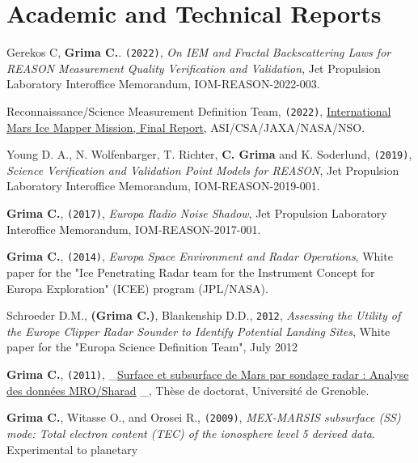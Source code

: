 \section*{Academic and Technical Reports}

\begin{etaremune}
\def\labelenumi{\arabic{enumi}.}
\item
   Gerekos C, \textbf{Grima C.}. \texttt{(2022)}, \emph{On IEM and Fractal Backscattering Laws for REASON Measurement Quality Verification and Validation}, Jet Propulsion Laboratory Interoffice Memorandum, IOM-REASON-2022-003.
\item
   Reconnaissance/Science Measurement Definition Team, \texttt{(2022)}, \href{https://science.nasa.gov/researchers/ice-mapper-measurement-definition-team}{International Mars Ice Mapper Mission, Final Report}, ASI/CSA/JAXA/NASA/NSO.
\item
   Young D. A., N. Wolfenbarger, T. Richter, \textbf{C. Grima} and K. Soderlund, \texttt{(2019)}, \emph{Science Verification and Validation Point Models for REASON}, Jet Propulsion Laboratory Interoffice Memorandum, IOM-REASON-2019-001.
\item
  \textbf{Grima C.}, \texttt{(2017)}, \emph{Europa Radio Noise Shadow},
  Jet Propulsion Laboratory Interoffice Memorandum, IOM-REASON-2017-001.
\item
  \textbf{Grima C.}, \texttt{(2014)}, \emph{Europa Space Environment and
  Radar Operations}, White paper for the "Ice Penetrating Radar team for
  the Instrument Concept for Europa Exploration" (ICEE) program
  (JPL/NASA).
\item
  Schroeder D.M., \textbf{(Grima C.)}, Blankenship D.D., \texttt{2012},
  \emph{Assessing the Utility of the Europe Clipper Radar Sounder to
  Identify Potential Landing Sites}, White paper for the "Europa Science
  Definition Team", July 2012
\item
  \textbf{Grima C.}, \texttt{(2011)},
  \_\href{https://www.google.com/url?sa=t\&rct=j\&q=\&esrc=s\&source=web\&cd=2\&ved=0ahUKEwiu-Jn8t7LPAhWEOSYKHQOlBeUQFggrMAE\&url=http\%3A\%2F\%2Fwww.theses.fr\%2F2011GRENU004.pdf\&usg=AFQjCNFcVxpOJiku0pWYrUsHbDrZU01hiA\&sig2=RAzQ2GJJIpOr1U3PEjRsXw}{Surface
  et subsurface de Mars par sondage radar : Analyse des données
  MRO/Sharad} \_, Thèse de doctorat, Université de Grenoble.
\item
  \textbf{Grima C.}, Witasse O., and Orosei R., \texttt{(2009)},
  \emph{MEX-MARSIS subsurface (SS) mode: Total electron content (TEC) of
  the ionosphere level 5 derived data}. Experimental to planetary

\end{etaremune}
